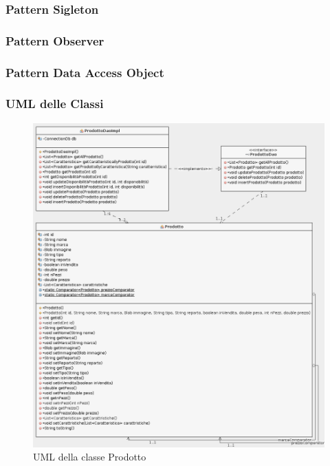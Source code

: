 \documentclass{article}
\begin{document}
\subsubsection{Pattern Sigleton}
\subsubsection{Pattern Observer}
\subsubsection{Pattern Data Access Object}
\subsubsection{UML delle Classi}
\begin{figure}[h!]
	\centering
	\includegraphics[width=\textwidth]{UmlProdotto.png}
	\caption{UML della classe Prodotto}
	\label{fig:UmlProdotto}
\end{figure}
\end{document}
